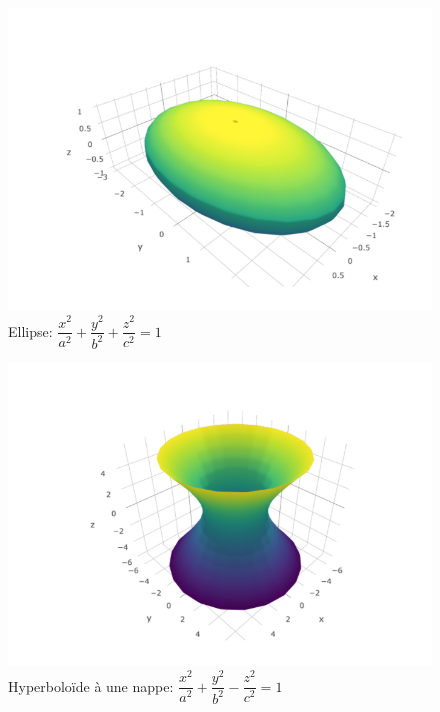 \documentclass[]{book}
\theoremstyle{definition}
\theoremstyle{definition}
\theoremstyle{definition}
\theoremstyle{remark}
\begin{document}
\begin{figure}

{\centering \includegraphics[width=0.8\linewidth]{resources/images/ellipse} 

}

\caption{Ellipse: $\dfrac{x^2}{a^2}+\dfrac{y^2}{b^2}+\dfrac{z^2}{c^2}=1$}\label{fig:ellipse}
\end{figure}

\begin{figure}

{\centering \includegraphics[width=0.8\linewidth]{resources/images/hyper1nappe} 

}

\caption{Hyperboloïde à une nappe: $\dfrac{x^2}{a^2}+\dfrac{y^2}{b^2}-\dfrac{z^2}{c^2}=1$}\label{fig:hyper1nappe}
\end{figure}
\end{document}
